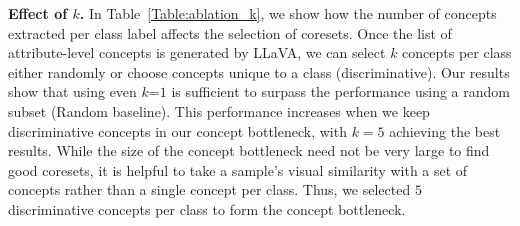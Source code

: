{\bf Effect of $k$.} In Table~\ref{Table:ablation_k}, we show how the number of concepts extracted per class label affects the selection of coresets. 
Once the list of attribute-level concepts is generated by LLaVA, we can select $k$ concepts per class either randomly or choose concepts unique to a class (discriminative). 
Our results show that using even $k$=$1$ is sufficient to surpass the performance using a random subset (Random baseline). 
This performance increases when we keep discriminative concepts in our concept bottleneck, with $k=5$ achieving the best results.
While the size of the concept bottleneck need not be very large to find good coresets, it is helpful to take a sample's visual similarity with a set of concepts rather than a single concept per class. %
Thus, we selected $5$ discriminative concepts per class to form the concept bottleneck. %









